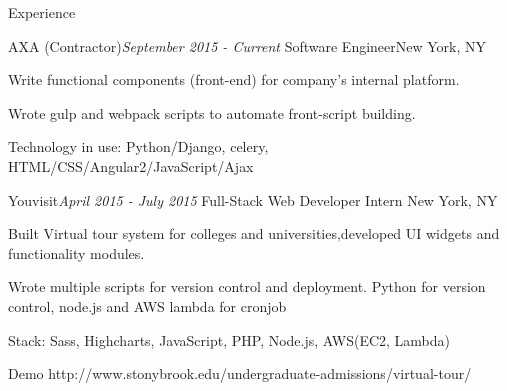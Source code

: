 \documentclass{resume} %
\begin{document}
\begin{rSection}{Experience}
\begin{rSubsection}{AXA (Contractor)}{\em September 2015 - Current }{Software Engineer}{New York, NY}
\item Write functional components (front-end) for company's internal platform.
\item Wrote gulp and webpack scripts to automate front-script building.
\item Technology in use: Python/Django, celery, HTML/CSS/Angular2/JavaScript/Ajax
\end{rSubsection}

\begin{rSubsection}{Youvisit}{\em April 2015 - July 2015 }{Full-Stack Web Developer Intern}{ New York, NY}
\item Built Virtual tour system for colleges and universities,developed UI widgets and functionality modules.
\item Wrote multiple scripts for version control and deployment. Python for version control, node.js and AWS lambda for cronjob
\item Stack: Sass, Highcharts, JavaScript, PHP, Node.js, AWS(EC2, Lambda)
\item Demo http://www.stonybrook.edu/undergraduate-admissions/virtual-tour/
\end{rSubsection}





\end{rSection}
\end{document}
